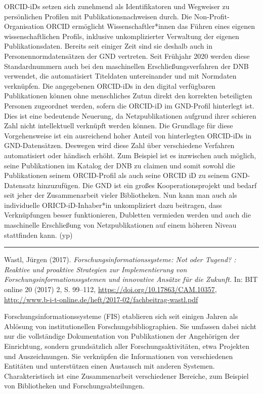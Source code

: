 \documentclass[a4paper,
fontsize=11pt,
oneside,
numbers=noperiodatend,
parskip=half-,
bibliography=totoc,
final
]{scrartcl}
\begin{document}
ORCID-iDs setzen sich zunehmend als Identifikatoren und Wegweiser zu
persönlichen Profilen mit Publikationsnachweisen durch. Die
Non-Profit-Organisation ORCID ermöglicht Wissenschaftler*innen das
Führen eines eigenen wissenschaftlichen Profils, inklusive
unkomplizierter Verwaltung der eigenen Publikationsdaten. Bereits seit
einiger Zeit sind sie deshalb auch in Personennormdatensätzen der GND
vertreten. Seit Frühjahr 2020 werden diese Standardnummern auch bei den
maschinellen Erschließungsverfahren der DNB verwendet, die automatisiert
Titeldaten untereinander und mit Normdaten verknüpfen. Die angegebenen
ORCID-iDs in den digital verfügbaren Publikationen können ohne
menschliches Zutun direkt den korrekten beteiligten Personen zugeordnet
werden, sofern die ORCID-iD im GND-Profil hinterlegt ist. Dies ist eine
bedeutende Neuerung, da Netzpublikationen aufgrund ihrer schieren Zahl
nicht intellektuell verknüpft werden können. Die Grundlage für diese
Vorgehensweise ist ein ausreichend hoher Anteil von hinterlegten
ORCID-iDs in GND-Datensätzen. Deswegen wird diese Zahl über verschiedene
Verfahren automatisiert oder händisch erhöht. Zum Beispiel ist es
inzwischen auch möglich, seine Publikationen im Katalog der DNB zu
claimen und somit sowohl die Publikationen seinem ORCID-Profil als auch
seine ORCID iD zu seinem GND-Datensatz hinzuzufügen. Die GND ist ein
großes Kooperationsprojekt und bedarf seit jeher der Zusammenarbeit
vieler Bibliotheken. Nun kann man auch als individuelle
ORICD-iD-Inhaber*in unkompliziert dazu beitragen, dass Verknüpfungen
besser funktionieren, Dubletten vermieden werden und auch die
maschinelle Erschließung von Netzpublikationen auf einem höheren Niveau
stattfinden kann. (yp)

\begin{center}\rule{0.5\linewidth}{0.5pt}\end{center}

Wastl, Jürgen (2017). \emph{Forschungsinformationssysteme: Not oder
Tugend? : Reaktive und proaktive Strategien zur Implementierung von
Forschungsinformationssystemen und innovative Ansätze für die Zukunft.}
In: BIT online 20 (2017) 2, S. 99--112,
\url{https://doi.org/10.17863/CAM.10357},
\url{http://www.b-i-t-online.de/heft/2017-02/fachbeitrag-wastl.pdf}

Forschungsinformationssysteme (FIS) etablieren sich seit einigen Jahren
als Ablösung von institutionellen Forschungsbibliographien. Sie umfassen
dabei nicht nur die vollständige Dokumentation von Publikationen der
Angehörigen der Einrichtung, sondern grundsätzlich aller
Forschungsaktivitäten, etwa Projekten und Auszeichnungen. Sie verknüpfen
die Informationen von verschiedenen Entitäten und unterstützen einen
Austausch mit anderen Systemen. Charakteristisch ist eine Zusammenarbeit
verschiedener Bereiche, zum Beispiel von Bibliotheken und
Forschungsabteilungen.
\end{document}
